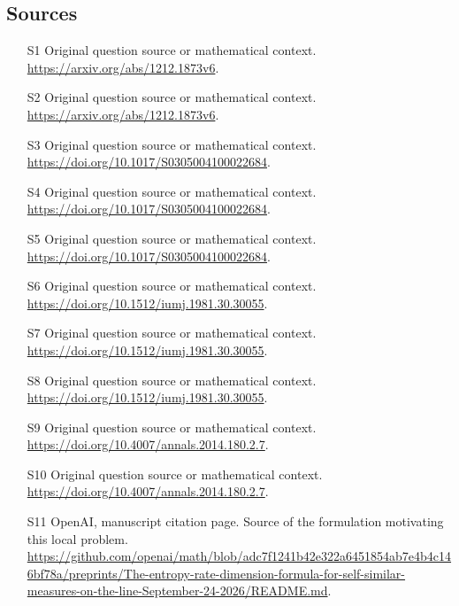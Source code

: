\documentclass[11pt]{article}
\begin{document}
\subsection{Sources}
\begin{itemize}
\item[S1] Original question source or mathematical context.
\url{https://arxiv.org/abs/1212.1873v6}.
\item[S2] Original question source or mathematical context.
\url{https://arxiv.org/abs/1212.1873v6}.
\item[S3] Original question source or mathematical context.
\url{https://doi.org/10.1017/S0305004100022684}.
\item[S4] Original question source or mathematical context.
\url{https://doi.org/10.1017/S0305004100022684}.
\item[S5] Original question source or mathematical context.
\url{https://doi.org/10.1017/S0305004100022684}.
\item[S6] Original question source or mathematical context.
\url{https://doi.org/10.1512/iumj.1981.30.30055}.
\item[S7] Original question source or mathematical context.
\url{https://doi.org/10.1512/iumj.1981.30.30055}.
\item[S8] Original question source or mathematical context.
\url{https://doi.org/10.1512/iumj.1981.30.30055}.
\item[S9] Original question source or mathematical context.
\url{https://doi.org/10.4007/annals.2014.180.2.7}.
\item[S10] Original question source or mathematical context.
\url{https://doi.org/10.4007/annals.2014.180.2.7}.
\item[S11] OpenAI, manuscript citation page. Source of the formulation motivating this local problem.
\url{https://github.com/openai/math/blob/adc7f1241b42e322a6451854ab7e4b4c146bf78a/preprints/The-entropy-rate-dimension-formula-for-self-similar-measures-on-the-line-September-24-2026/README.md}.
\end{itemize}
\end{document}
